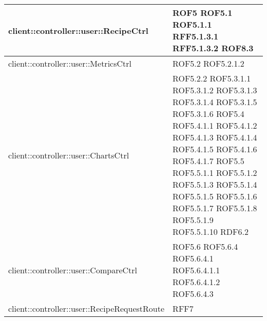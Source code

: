 \begin{center}
\begin{longtable}{| p{11cm} | p{2.5cm} |}
\hline
client::controller::user::RecipeCtrl & ROF5 \newline ROF5.1 \newline ROF5.1.1 \newline RFF5.1.3.1 \newline RFF5.1.3.2 \newline ROF8.3 \\
\hline
client::controller::user::MetricsCtrl & ROF5.2 \newline ROF5.2.1.2 \\
\hline
client::controller::user::ChartsCtrl & ROF5.2.2 \newline ROF5.3.1.1 \newline ROF5.3.1.2 \newline ROF5.3.1.3 \newline ROF5.3.1.4 \newline ROF5.3.1.5 \newline ROF5.3.1.6 \newline ROF5.4 \newline ROF5.4.1.1 \newline ROF5.4.1.2 \newline ROF5.4.1.3 \newline ROF5.4.1.4 \newline ROF5.4.1.5 \newline ROF5.4.1.6 \newline ROF5.4.1.7 \newline ROF5.5 \newline ROF5.5.1.1 \newline ROF5.5.1.2 \newline ROF5.5.1.3 \newline ROF5.5.1.4 \newline ROF5.5.1.5 \newline ROF5.5.1.6 \newline ROF5.5.1.7 \newline ROF5.5.1.8 \newline ROF5.5.1.9 \newline ROF5.5.1.10 \newline RDF6.2 \\
\hline
client::controller::user::CompareCtrl & ROF5.6 \newline ROF5.6.4 \newline ROF5.6.4.1 \newline ROF5.6.4.1.1 \newline ROF5.6.4.1.2 \newline ROF5.6.4.3 \\
\hline
client::controller::user::RecipeRequestRoute & RFF7 \\

\end{longtable}
\end{center}
